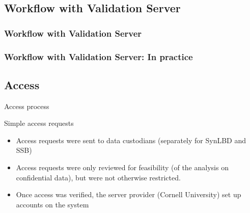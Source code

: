 
\subsection{Workflow with Validation Server}

\begin{frame}
\frametitle{Workflow with Validation Server}

\scalebox{0.6}{
\myworkflow
}
\end{frame}

\begin{frame}
\frametitle{Workflow with Validation Server: In practice}

\scalebox{0.6}{
\myworkflownon
}
\end{frame}



\subsection{Access}

\begin{frame}{Access process}
\scalebox{0.1}{\myworkflow}
\begin{block}{Simple access requests}
\begin{itemize}
	\item Access requests were sent to data custodians (separately for SynLBD and SSB)
	\item Access requests were only reviewed for feasibility (of the analysis on confidential data), but were not otherwise restricted. 
	\item Once access was verified,  the server provider (Cornell University) set up accounts on the system
	\end{itemize}
\end{block}
\end{frame}


